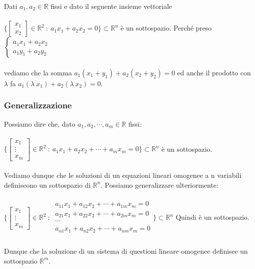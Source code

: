 \begin{example}
Dati $a_1, a_2 \in \mathbb{R}$ fissi e dato il seguente insieme vettoriale\\\\
$\Bigg \{ \begin{bmatrix}x_1 \\ x_2\end{bmatrix}\in \mathbb{R}^2 \: : \: a_1x_1 + a_2x_2 = 0\Bigg\} \subset \mathbb{R}^n$ è un sottospazio. Perché preso
$\begin{cases}a_1x_1 + a_2x_2 \\a_1y_1 + a_2y_2 \end{cases}$\\\\
vediamo che la somma $a_1(x_1 + y_1) + a_2(x_2 + y_2) = 0$ ed anche il prodotto con $\lambda$ fa $a_1(\lambda\: x_1) + a_2(\lambda \: x_2)=0$.
\subsubsection{Generalizzazione}
Possiamo dire che, dato $a_1, a_2, \cdots, a_m \in \mathbb{R}$ fissi:\\\\
$\Bigg \{ \begin{bmatrix}x_1 \\ \vdots \\ x_m\end{bmatrix}\in \mathbb{R}^2 \: : \: a_1x_1 + a_2x_2 + \cdots + a_mx_m = 0\Bigg\} \subset \mathbb{R}^n$ è un sottospazio.\\\\Vediamo dunque che le soluzioni di un equazioni lineari omogenee a n variabili definiscono un sottospazio di $\mathbb{R}^n$. Possiamo generalizzare ulteriormente:\\\\
$\Bigg \{ \begin{bmatrix}x_1 \\ \vdots \\ x_m\end{bmatrix}\in \mathbb{R}^2 \: : \: \begin{array}{l}
    a_{11}x_1 + a_{12}x_2 + \cdots + a_{1m}x_m = 0\\
    a_{21}x_1 + a_{22}x_2 + \cdots + a_{2m}x_m = 0\\
    \cdots\\
    a_{n1}x_1 + a_{n2}x_2 + \cdots + a_{nm}x_m = 0\\
\end{array}\Bigg\} \subset \mathbb{R}^n$ Quindi è un sottospazio.\\\\
Dunque che la soluzione di un sistema di questioni lineare omogenee definisce un sottospazio $\mathbb{R}^m$.
\end{example}
\newpage
